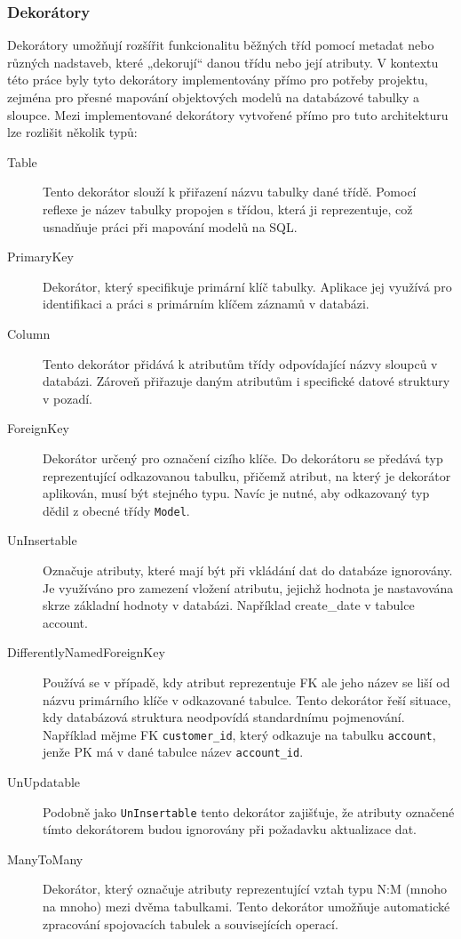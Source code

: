 \subsubsection{Dekorátory}
Dekorátory umožňují rozšířit funkcionalitu běžných tříd pomocí metadat nebo různých nadstaveb, které „dekorují“ danou třídu nebo její atributy\cite{TSDecorators}. V kontextu této práce byly tyto dekorátory implementovány přímo pro potřeby projektu, zejména pro přesné mapování objektových modelů na databázové tabulky a sloupce. Mezi implementované dekorátory vytvořené přímo pro tuto architekturu lze rozlišit několik typů:
\begin{description}
    \item[Table] 
    Tento dekorátor slouží k přiřazení názvu tabulky dané třídě. Pomocí reflexe je název tabulky propojen s třídou, která ji reprezentuje, což usnadňuje práci při mapování modelů na SQL.
    \item[PrimaryKey]  
Dekorátor, který specifikuje primární klíč tabulky. Aplikace jej využívá pro identifikaci a práci s primárním klíčem záznamů v databázi.

\item[Column] 
Tento dekorátor přidává k atributům třídy odpovídající názvy sloupců v databázi. Zároveň přiřazuje daným atributům i specifické datové struktury v pozadí.

\item[ForeignKey] 
Dekorátor určený pro označení cizího klíče. Do dekorátoru se předává typ reprezentující odkazovanou tabulku, přičemž atribut, na který je dekorátor aplikován, musí být stejného typu. Navíc je nutné, aby odkazovaný typ dědil z obecné třídy \texttt{Model}.

\item[UnInsertable]
Označuje atributy, které mají být při vkládání dat do databáze ignorovány. Je využíváno pro zamezení vložení atributu, jejichž hodnota je nastavována skrze základní hodnoty v databázi. Například create\_date v tabulce account.

\item[DifferentlyNamedForeignKey]  
Používá se v případě, kdy atribut reprezentuje FK ale jeho název se liší od názvu primárního klíče v odkazované tabulce. Tento dekorátor řeší situace, kdy databázová struktura neodpovídá standardnímu pojmenování. Například mějme FK \texttt{customer\_id}, který odkazuje na tabulku \texttt{account}, jenže PK má v dané tabulce název \texttt{account\_id}.

\item[UnUpdatable]  
Podobně jako \texttt{UnInsertable} tento dekorátor zajišťuje, že atributy označené tímto dekorátorem budou ignorovány při požadavku aktualizace dat.

\item[ManyToMany]
Dekorátor, který označuje atributy reprezentující vztah typu N:M (mnoho na mnoho) mezi dvěma tabulkami. Tento dekorátor umožňuje automatické zpracování spojovacích tabulek a souvisejících operací.
\end{description}